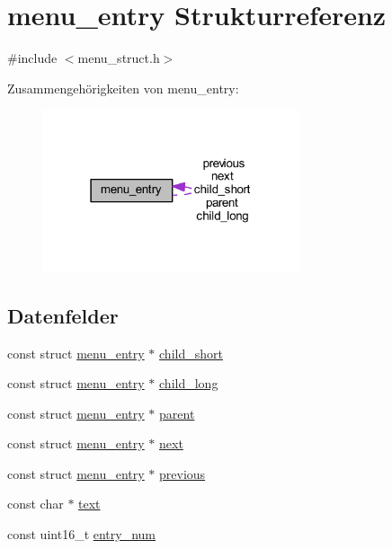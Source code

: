\hypertarget{structmenu__entry}{}\section{menu\+\_\+entry Strukturreferenz}
\label{structmenu__entry}


{\ttfamily \#include $<$menu\+\_\+struct.\+h$>$}



Zusammengehörigkeiten von menu\+\_\+entry\+:\nopagebreak
\begin{figure}[H]
\begin{center}
\leavevmode
\includegraphics[width=214pt]{structmenu__entry__coll__graph}
\end{center}
\end{figure}
\subsection*{Datenfelder}
\begin{DoxyCompactItemize}
\item 
const struct \hyperlink{structmenu__entry}{menu\+\_\+entry} $\ast$ \hyperlink{structmenu__entry_a759c31dc71a94a9bbafdc849d2db5c1a}{child\+\_\+short}
\item 
const struct \hyperlink{structmenu__entry}{menu\+\_\+entry} $\ast$ \hyperlink{structmenu__entry_a79da8f2d51ac63708f7f8f41b56d0102}{child\+\_\+long}
\item 
const struct \hyperlink{structmenu__entry}{menu\+\_\+entry} $\ast$ \hyperlink{structmenu__entry_ac1b562fabcc9402003931e8351d6faf7}{parent}
\item 
const struct \hyperlink{structmenu__entry}{menu\+\_\+entry} $\ast$ \hyperlink{structmenu__entry_a8667330bb5cb56772e88abd901064211}{next}
\item 
const struct \hyperlink{structmenu__entry}{menu\+\_\+entry} $\ast$ \hyperlink{structmenu__entry_a66676e2c3f7553b50a8c1d0c4e973734}{previous}
\item 
const char $\ast$ \hyperlink{structmenu__entry_a16343090e80c4472521560f30113d96c}{text}
\item 
const uint16\+\_\+t \hyperlink{structmenu__entry_aead51ebe631627145d52a84b2d92e240}{entry\+\_\+num}
\end{DoxyCompactItemize}


